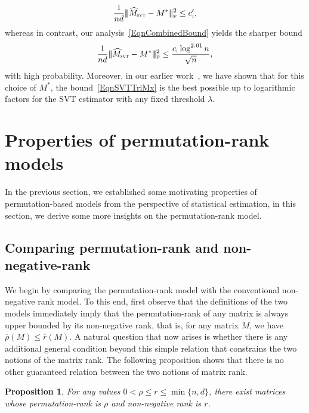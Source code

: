 \documentclass[11pt, hidelinks]{article} %
\newtheorem{proposition}{Proposition}
\newcommand{\matsnorm}[2]{|\!|\!| #1 | \! | \!|_{{#2}}}
\newcommand{\frobnorm}[1]{\ensuremath{\matsnorm{#1}{\mbox{\tiny{F}}}}}
\newcommand{\numrows}{n}
\newcommand{\numcols}{d}
\newcommand{\plaincon}{c}
\newcommand{\UUP}{\ensuremath{\plaincon_{\mbox{\scalebox{.5}{1}}}}}
\newcommand{\wtmatrix}{M}
\newcommand{\wt}{\wtmatrix}
\newcommand{\wtstar}{\wtmatrix^*}
\newcommand{\wthat}{\widehat{\wtmatrix}}
\newcommand{\nnrank}{r}
\newcommand{\permrank}{\rho}
\newcommand{\fnpermrank}[1]{\overline{\permrank}(#1)}
\newcommand{\fnnnrank}[1]{\overline{\nnrank}(#1)}
\newcommand{\regpar}{\ensuremath{\lambda}}
\newcommand{\wthatSVT}{\wthat_{\mbox{\scalebox{.5}{SVT}}}}
\begin{document}
\begin{align*}
\frac{1}{\numrows \numcols} \frobnorm{\wthatSVT - \wtstar}^2 \leq \UUP',
\end{align*}
whereas in contrast, our analysis~\eqref{EqnCombinedBound} yields the sharper bound
\begin{align}
\label{EqnSVTTriMx}
\frac{1}{\numrows \numcols} \frobnorm{\wthatSVT - \wtstar}^2 \leq  \frac{\UUP \log^{2.01} \numrows}{\sqrt{\numrows}},
\end{align}
with high probability. Moreover, in our earlier work~\cite{shah2015stochastically}, we have shown that for this choice of $\wtstar$, the bound~\eqref{EqnSVTTriMx} is the best possible up to logarithmic factors for the SVT estimator with any fixed threshold $\regpar$. 



\section{Properties of permutation-rank models}
\label{SecPropPermModel}

In the previous section, we established some motivating properties of permutation-based models from the perspective of statistical estimation, in this section, we derive some more insights on the
permutation-rank model.



\subsection{Comparing permutation-rank and non-negative-rank}

We begin by comparing the permutation-rank model with the conventional
non-negative rank model. To this end, first observe that the
definitions of the two models immediately imply that the
permutation-rank of any matrix is always upper bounded by its
non-negative rank, that is, for any matrix $\wt$, we have
  $\fnpermrank{\wt} \leq \fnnnrank{\wt}$. 
%
A natural question that now arises is whether there is any additional general condition beyond this
simple relation that
constrains the two notions of the matrix rank. The following
proposition shows that there is no other guaranteed relation between
the two notions of matrix rank.


\begin{proposition}
  \label{PropAnyRank}
  For any values $0 < \permrank \leq \nnrank \leq
  \min\{\numrows,\numcols\}$, there exist matrices whose
  permutation-rank is $\permrank$ and non-negative rank is $\nnrank$.
\end{proposition}
\end{document}
